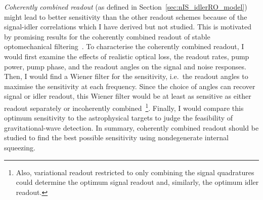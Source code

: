 \emph{Coherently combined readout} (as defined in Section~\ref{sec:nIS_idlerRO_model}) might lead to better sensitivity than the other readout schemes because of the signal-idler correlations which I have derived but not studied. This is motivated by promising results for the coherently combined readout of stable optomechanical filtering~\cite{liEnhancingInterferometerSensitivity2021}. To characterise the coherently combined readout, I would first examine the effects of realistic optical loss, the readout rates, pump power, pump phase, and the readout angles on the signal and noise responses. Then, I would find a Wiener filter for the sensitivity, i.e.\ the readout angles to maximise the sensitivity at each frequency. Since the choice of angles can recover signal or idler readout, this Wiener filter would be at least as sensitive as either readout separately or incoherently combined~\footnote{Also, variational readout restricted to only combining the signal quadratures could determine the optimum signal readout and, similarly, the optimum idler readout.}. Finally, I would compare this optimum sensitivity to the astrophysical targets to judge the feasibility of gravitational-wave detection.
In summary, coherently combined readout should be studied to find the best possible sensitivity using nondegenerate internal squeezing.


